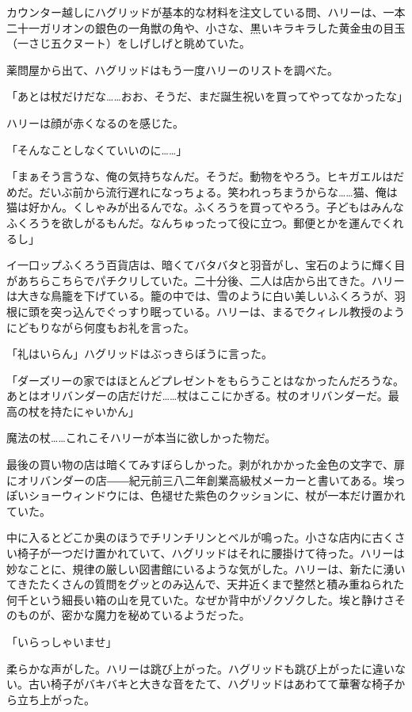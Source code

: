 \documentclass[10pt,a4paper]{article}
\begin{document}
\begin{CJK}{UTF8}{min}
カウンター越しにハグリッドが基本的な材料を注文している問、ハリーは、一本二十一ガリオンの銀色の一角獣の角や、小さな、黒いキラキラした黄金虫の目玉（一さじ五クヌート）をしげしげと眺めていた。

薬問屋から出て、ハグリッドはもう一度ハリーのリストを調べた。

「あとは杖だけだな……おお、そうだ、まだ誕生祝いを買ってやってなかったな」

ハリーは顔が赤くなるのを感じた。

「そんなことしなくていいのに……」

「まぁそう言うな、俺の気持ちなんだ。そうだ。動物をやろう。ヒキガエルはだめだ。だいぶ前から流行遅れになっちょる。笑われっちまうからな……猫、俺は猫は好かん。くしゃみが出るんでな。ふくろうを買ってやろう。子どもはみんなふくろうを欲しがるもんだ。なんちゅったって役に立つ。郵便とかを運んでくれるし」

イ一口ップふくろう百貨店は、暗くてバタバタと羽音がし、宝石のように輝く目があちらこちらでパチクリしていた。二十分後、二人は店から出てきた。ハリーは大きな鳥籠を下げている。籠の中では、雪のように白い美しいふくろうが、羽根に頭を突っ込んでぐっすり眠っている。ハリーは、まるでクィレル教授のようにどもりながら何度もお礼を言った。

「礼はいらん」ハグリッドはぶっきらぼうに言った。

「ダーズリーの家ではほとんどプレゼントをもらうことはなかったんだろうな。あとはオリバンダーの店だけだ……杖はここにかぎる。杖のオリバンダーだ。最高の杖を持たにゃいかん」

魔法の杖……これこそハリーが本当に欲しかった物だ。

最後の買い物の店は暗くてみすぼらしかった。剥がれかかった金色の文字で、扉にオリバンダーの店――紀元前三八二年創業高級杖メーカーと書いてある。埃っぽいショーウィンドウには、色褪せた紫色のクッションに、杖が一本だけ置かれていた。

中に入るとどこか奥のほうでチリンチリンとベルが鳴った。小さな店内に古くさい椅子が一つだけ置かれていて、ハグリッドはそれに腰掛けて待った。ハリーは妙なことに、規律の厳しい図書館にいるような気がした。ハリーは、新たに湧いてきたたくさんの質問をグッとのみ込んで、天井近くまで整然と積み重ねられた何千という細長い箱の山を見ていた。なぜか背中がゾクゾクした。埃と静けさそのものが、密かな魔力を秘めているようだった。

「いらっしゃいませ」

柔らかな声がした。ハリーは跳び上がった。ハグリッドも跳び上がったに違いない。古い椅子がバキバキと大きな音をたて、ハグリッドはあわてて華奢な椅子から立ち上がった。


\end{CJK}
\end{document}
